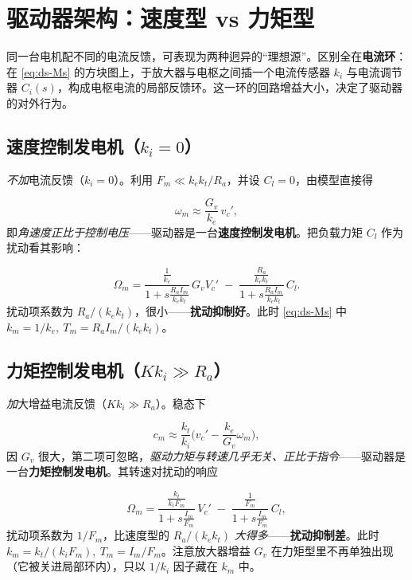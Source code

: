 \section{驱动器架构：速度型 vs 力矩型}
\label{sec:ds-drives}

同一台电机配不同的电流反馈，可表现为两种迥异的“理想源”。区别全在\textbf{电流环}：在 \cref{eq:ds-Ms} 的方块图上，于放大器与电枢之间插一个电流传感器 $k_i$ 与电流调节器 $C_i(s)$，构成电枢电流的局部反馈环。这一环的回路增益大小，决定了驱动器的对外行为。

\subsection{速度控制发电机（$k_i=0$）}

\emph{不加}电流反馈（$k_i=0$）。利用 $F_m\ll k_ek_t/R_a$，并设 $C_l=0$，由模型直接得

\begin{equation}
\omega_m \approx \frac{G_v}{k_e}\,v_c',
\label{eq:ds-velgen}
\end{equation}
即\emph{角速度正比于控制电压}——驱动器是一台\textbf{速度控制发电机}。把负载力矩 $C_l$ 作为扰动看其影响：

\begin{equation}
\Omega_m=\frac{\frac{1}{k_e}}{1+s\frac{R_aI_m}{k_ek_t}}\,G_vV_c'\;-\;\frac{\frac{R_a}{k_ek_t}}{1+s\frac{R_aI_m}{k_ek_t}}\,C_l.
\label{eq:ds-velgen-tf}
\end{equation}
扰动项系数为 $R_a/(k_ek_t)$，很小——\textbf{扰动抑制好}。此时 \cref{eq:ds-Ms} 中 $k_m=1/k_e,\ T_m=R_aI_m/(k_ek_t)$。

\subsection{力矩控制发电机（$Kk_i\gg R_a$）}

\emph{加}大增益电流反馈（$Kk_i\gg R_a$）。稳态下

\begin{equation}
c_m \approx \frac{k_t}{k_i}\Big(v_c'-\frac{k_e}{G_v}\omega_m\Big),
\label{eq:ds-torquegen}
\end{equation}
因 $G_v$ 很大，第二项可忽略，\emph{驱动力矩与转速几乎无关、正比于指令}——驱动器是一台\textbf{力矩控制发电机}。其转速对扰动的响应

\begin{equation}
\Omega_m=\frac{\frac{k_t}{k_iF_m}}{1+s\frac{I_m}{F_m}}\,V_c'\;-\;\frac{\frac{1}{F_m}}{1+s\frac{I_m}{F_m}}\,C_l,
\label{eq:ds-torquegen-tf}
\end{equation}
扰动项系数为 $1/F_m$，比速度型的 $R_a/(k_ek_t)$ \emph{大得多}——\textbf{扰动抑制差}。此时 $k_m=k_t/(k_iF_m),\ T_m=I_m/F_m$。注意放大器增益 $G_v$ 在力矩型里不再单独出现（它被关进局部环内），只以 $1/k_i$ 因子藏在 $k_m$ 中。

